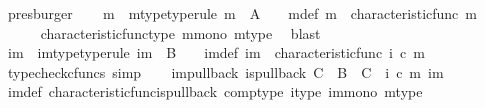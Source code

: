 \begin{isabellebody}
\ presburger\isanewline
\ \ \isamarkupfalse%
\ {\isasymchi}m\ \ {\isasymchi}m{\isacharunderscore}{\kern0pt}type{\isacharbrackleft}{\kern0pt}type{\isacharunderscore}{\kern0pt}rule{\isacharbrackright}{\kern0pt}{\isacharcolon}{\kern0pt}\ {\isachardoublequoteopen}{\isasymchi}m\ {\isacharcolon}{\kern0pt}\ A\ {\isasymrightarrow}\ {\isasymOmega}{\isachardoublequoteclose}\ \ {\isasymchi}m{\isacharunderscore}{\kern0pt}def{\isacharcolon}{\kern0pt}\ {\isachardoublequoteopen}{\isasymchi}m\ {\isacharequal}{\kern0pt}\ characteristic{\isacharunderscore}{\kern0pt}func\ m{\isachardoublequoteclose}\isanewline
\ \ \ \ \isamarkupfalse%
\ characteristic{\isacharunderscore}{\kern0pt}func{\isacharunderscore}{\kern0pt}type\ m{\isacharunderscore}{\kern0pt}mono\ m{\isacharunderscore}{\kern0pt}type\ \isamarkupfalse%
\ blast\isanewline
\ \ \isamarkupfalse%
\ {\isasymchi}im\ \ {\isasymchi}im{\isacharunderscore}{\kern0pt}type{\isacharbrackleft}{\kern0pt}type{\isacharunderscore}{\kern0pt}rule{\isacharbrackright}{\kern0pt}{\isacharcolon}{\kern0pt}\ {\isachardoublequoteopen}{\isasymchi}im\ {\isacharcolon}{\kern0pt}\ B\ {\isasymrightarrow}\ {\isasymOmega}{\isachardoublequoteclose}\ \ {\isasymchi}im{\isacharunderscore}{\kern0pt}def{\isacharcolon}{\kern0pt}\ {\isachardoublequoteopen}{\isasymchi}im\ {\isacharequal}{\kern0pt}\ characteristic{\isacharunderscore}{\kern0pt}func\ {\isacharparenleft}{\kern0pt}i\ {\isasymcirc}\isactrlsub c\ m{\isacharparenright}{\kern0pt}{\isachardoublequoteclose}\isanewline
\ \ \ \ \isamarkupfalse%
\ {\isacharparenleft}{\kern0pt}typecheck{\isacharunderscore}{\kern0pt}cfuncs{\isacharcomma}{\kern0pt}\ simp{\isacharparenright}{\kern0pt}\isanewline
\ \ \isamarkupfalse%
\ {\isasymchi}im{\isacharunderscore}{\kern0pt}pullback{\isacharcolon}{\kern0pt}\ {\isachardoublequoteopen}is{\isacharunderscore}{\kern0pt}pullback\ C\ {\isasymone}\ B\ {\isasymOmega}\ {\isacharparenleft}{\kern0pt}{\isasymbeta}\isactrlbsub C\isactrlesub {\isacharparenright}{\kern0pt}\ {\isasymt}\ {\isacharparenleft}{\kern0pt}i\ {\isasymcirc}\isactrlsub c\ m{\isacharparenright}{\kern0pt}\ {\isasymchi}im{\isachardoublequoteclose}\isanewline
\ \ \ \ \isamarkupfalse%
\ {\isasymchi}im{\isacharunderscore}{\kern0pt}def\ characteristic{\isacharunderscore}{\kern0pt}func{\isacharunderscore}{\kern0pt}is{\isacharunderscore}{\kern0pt}pullback\ comp{\isacharunderscore}{\kern0pt}type\ i{\isacharunderscore}{\kern0pt}type\ im{\isacharunderscore}{\kern0pt}mono\ m{\isacharunderscore}{\kern0pt}type\ \isamarkupfalse%

\end{isabellebody}
